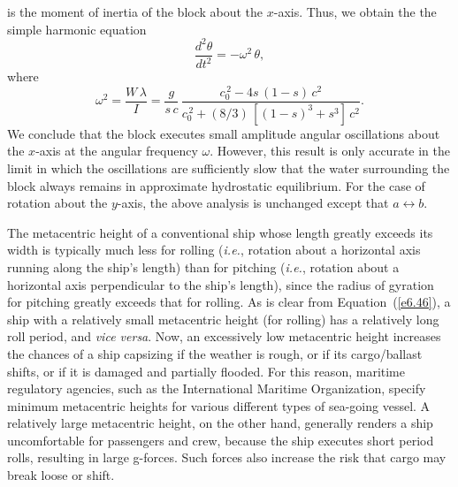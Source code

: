 is the moment of inertia of the block about the $x$-axis. Thus, we obtain the the simple harmonic equation 
\begin{equation}
\frac{d^2\theta}{dt^2} = -\omega^2\,\theta,
\end{equation}
where
\begin{equation}\label{e6.46}
\omega^2 = \frac{W\,\lambda}{I}= \frac{g}{s\,c}\,\frac{c_0^{\,2}-4s\,(1-s)\,c^{2}}{c_0^{\,2}+(8/3)\,[(1-s)^3+s^3]\,c^{2}}.
\end{equation} 
We conclude that the block executes small amplitude angular oscillations about the $x$-axis at the angular frequency $\omega$. However, this result is only
accurate in the limit in which the oscillations are sufficiently slow that the water surrounding the block always remains
in approximate hydrostatic equilibrium. For the case of rotation about the $y$-axis, the above analysis
is unchanged except that $a\leftrightarrow b$. 

The metacentric height  of a conventional ship whose length  greatly exceeds its width is typically
much less for rolling ({\em i.e.}, rotation about a horizontal axis
running along the ship's length)  than  for pitching  ({\em i.e.}, rotation about a horizontal axis
perpendicular to the ship's length), since the radius of gyration for pitching greatly exceeds that for rolling.
As is clear
from Equation~(\ref{e6.46}),  a ship with a relatively small  metacentric height (for rolling) has a relatively long roll period, and {\em vice versa}. Now,  an excessively low metacentric height increases the chances of a ship capsizing   if the weather is rough, or if its cargo/ballast shifts, or if it is
damaged and partially flooded.  For this reason, maritime regulatory agencies, such as the International Maritime Organization, specify minimum metacentric heights for various different types of sea-going vessel. A relatively large metacentric height, on the other hand, 
generally renders a ship uncomfortable for passengers and crew, because the ship executes short period rolls, resulting in large g-forces. Such forces also increase the risk that cargo may break loose or shift.  

